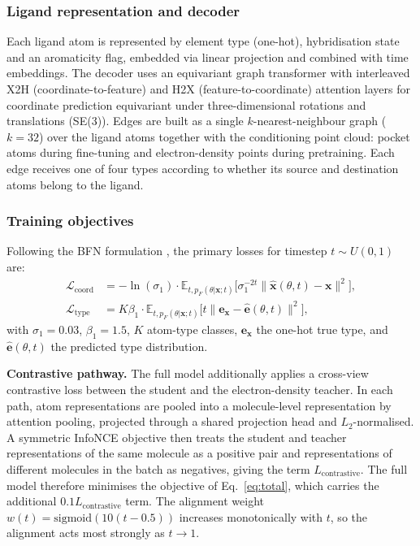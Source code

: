 \documentclass[pdflatex,sn-mathphys-num]{sn-jnl}
\theoremstyle{thmstyleone}
\theoremstyle{thmstyletwo}
\theoremstyle{thmstylethree}
\begin{document}
\subsubsection{Ligand representation and decoder}

Each ligand atom is represented by element type (one-hot), hybridisation state and an aromaticity flag, embedded via linear projection and combined with time embeddings. The decoder uses an equivariant graph transformer with interleaved X2H (coordinate-to-feature) and H2X (feature-to-coordinate) attention layers for coordinate prediction equivariant under three-dimensional rotations and translations (SE(3)). Edges are built as a single \(k\)-nearest-neighbour graph (\(k=32\)) over the ligand atoms together with the conditioning point cloud: pocket atoms during fine-tuning and electron-density points during pretraining. Each edge receives one of four types according to whether its source and destination atoms belong to the ligand.

\subsubsection{Training objectives}

Following the BFN formulation \cite{graves2023bfn}, the primary losses for timestep \(t \sim U(0,1)\) are:
\begin{align}
\mathcal{L}_{\text{coord}} &= -\ln(\sigma_1) \cdot \mathbb{E}_{t, p_F(\theta|\mathbf{x};t)} \bigl[ \sigma_1^{-2t} \|\hat{\mathbf{x}}(\theta,t) - \mathbf{x}\|^2 \bigr], \label{eq:coord} \\
\mathcal{L}_{\text{type}} &= K\beta_1 \cdot \mathbb{E}_{t, p_F(\theta|\mathbf{x};t)} \bigl[ t \| \mathbf{e}_{\mathbf{x}} - \hat{\mathbf{e}}(\theta,t) \|^2 \bigr], \label{eq:type}
\end{align}
with \(\sigma_1 = 0.03\), \(\beta_1 = 1.5\), \(K\) atom-type classes, \(\mathbf{e}_{\mathbf{x}}\) the one-hot true type, and \(\hat{\mathbf{e}}(\theta,t)\) the predicted type distribution.

\medskip
\noindent\textbf{Contrastive pathway.} The full model additionally applies a cross-view contrastive loss between the student and the electron-density teacher. In each path, atom representations are pooled into a molecule-level representation by attention pooling, projected through a shared projection head and $L_2$-normalised. A symmetric InfoNCE objective then treats the student and teacher representations of the same molecule as a positive pair and representations of different molecules in the batch as negatives, giving the term $L_{\mathrm{contrastive}}$. The full model therefore minimises the objective of Eq.~\eqref{eq:total}, which carries the additional $0.1L_{\mathrm{contrastive}}$ term. The alignment weight $w(t)=\mathrm{sigmoid}(10(t-0.5))$ increases monotonically with $t$, so the alignment acts most strongly as $t\to1$.
\end{document}

